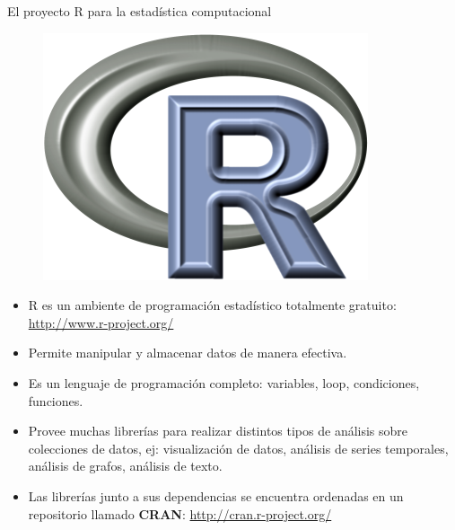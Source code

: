 \documentclass[handout]{beamer}
\begin{document}
\begin{frame}{El proyecto R para la estadística computacional}
\begin{figure}[h!]
	\centering
	\includegraphics[scale=0.6]{imagenes/Rlogo.png}
\end{figure}
\scriptsize{
\begin{itemize}
 \item R es un ambiente de programación estadístico totalmente gratuito: \url{http://www.r-project.org/}
 \item Permite manipular y almacenar datos de manera efectiva.
 \item Es un lenguaje de programación completo: variables, loop, condiciones, funciones.
 \item Provee muchas librerías para realizar distintos tipos de análisis sobre colecciones de datos, ej: visualización de datos, análisis de series temporales, análisis de grafos, análisis de texto.
 \item Las librerías junto a sus dependencias se encuentra ordenadas en un repositorio llamado \textbf{CRAN}: \url{http://cran.r-project.org/}

\end{itemize}

}



\end{frame}
\end{document}
